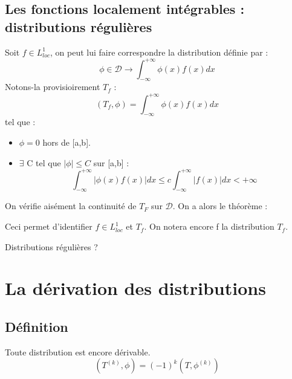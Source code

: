 \documentclass{article}
\begin{document}
\subsection{Les fonctions localement intégrables : distributions régulières}

Soit $f\in L^1_{loc}$, on peut lui faire correspondre la distribution définie par : 
\[\phi\in \mathcal{D} \rightarrow \int_{-\infty}^{+\infty} \phi(x) f(x) dx\]
Notons-la provisioirement $T_f$ : \[(T_f,\phi)=\int_{-\infty}^{+\infty} \phi(x) f(x) dx\] tel que :
\begin{itemize}
\item $\phi=0$ hors de [a,b].
\item $\exists$ C tel que $|\phi|\leq C$ sur [a,b] : \[\int_{-\infty}^{+\infty} |\phi(x) f(x)| dx \leq c\int_{-\infty}^{+\infty} |f(x)| dx < +\infty\]
\end{itemize}

On vérifie aisément la continuité de $T_F$ sur $\mathcal{D}$. On a alors le théorème :\\
\indent {}

Ceci permet d'identifier $f\in L^1_{loc}$ et $T_f$. On notera encore f la distribution $T_f$.

Distributions régulières ?

\section{La dérivation des distributions}
\subsection{Définition}

\begin{rmq}
Toute distribution est encore dérivable. \[(T^{(k)},\phi)=(-1)^k (T,\phi^{(k)})\]
\end{rmq}

\end{document}
